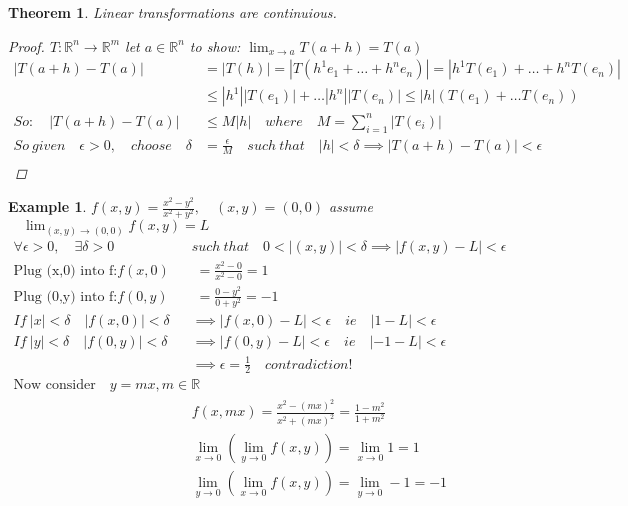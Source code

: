 \documentclass[12pt]{article}
\def\RR{\mathbb{R}}
\newtheorem{theorem}{Theorem}[section]
\newtheorem{example}{Example}[section]
\begin{document}
\begin{theorem}\label{T:Lin trans cont}
Linear transformations are continuious.
\begin{proof}
$T:\RR^{n} \rightarrow \RR^{m}$ let $a \in \RR^{n}$ to show: $\lim_{x\to a}T(a+h) = T(a)$
\begin{align*}
|T(a+h) - T(a)| & = |T(h)|=|T(h^{1}e_{1}+ \dots +h^{n}e_{n})| =|h^{1}T(e_{1}) + \dots +h^{n}T(e_{n})|\\ 
&\leq  |h^{1}||T(e_{1})|+ \dots |h^{n}||T(e_{n})| \leq |h|(T(e_{1})+ \dots T(e_{n})) \\
So: \quad |T(a+h) - T(a)| &\leq  M|h| \quad where \quad M= \sum_{i=1}^{n}|T(e_i)| \\
So \: given \quad \epsilon > 0,\quad choose \quad \delta &= \frac{\epsilon}{M} \quad such \: that \quad |h|< \delta \implies |T(a+h) - T(a)|< \epsilon \\
\end{align*}
\end{proof}
\end{theorem}

\begin{example}
$f(x,y)= \frac{x^{2} - y^{2}}{x^{2} +y^{2}}, \quad (x,y)=(0,0)$ assume $\quad \lim_{(x,y) \to (0,0)} f(x,y) = L$
\begin{align*}
\forall \epsilon > 0, \quad  \exists \delta >0  \quad &such\: that \quad 0<|(x,y)|<\delta \implies |f(x,y)-L|<\epsilon \\
\text{Plug (x,0) into f:} f(x,0) &\;= \frac{x^{2}-0}{x^{2}-0} = 1\\
\text{Plug (0,y) into f:}  f(0,y)&\;= \frac{0-y^{2}}{0 +y^{2}} = -1\\
If \: |x|< \delta \quad |f(x,0)| < \delta & \implies |f(x,0) - L|< \epsilon \quad ie \quad |1-L|< \epsilon\\
If \: |y|< \delta \quad |f(0,y)| < \delta& \implies |f(0,y) - L|< \epsilon \quad ie \quad |-1-L|< \epsilon\\
&\implies \epsilon = \frac{1}{2} \quad contradiction! \\
\text{Now consider} \quad y=mx, m\in \RR&\\
&f(x,mx)=\frac{x^{2} - (mx)^{2}}{x^{2} + (mx)^{2}} = \frac{1-m^{2}}{1+m^{2}}\\
&\lim_{x \to 0}(\lim_{y \to 0} f(x,y)) = \lim_{x \to 0}1 = 1\\
&\lim_{y \to 0}(\lim_{x \to 0} f(x,y)) = \lim_{y \to 0}-1 = -1\\
\end{align*}
\\

\end{example}
\end{document}
